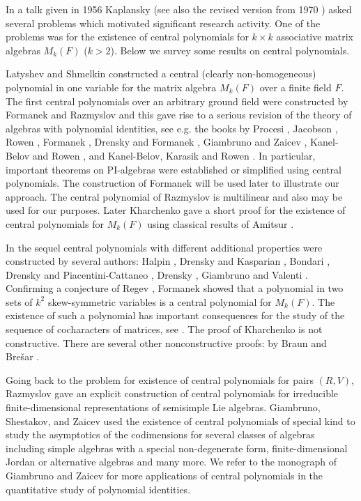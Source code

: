 \documentclass[10]{amsart}
\theoremstyle{definition}
\begin{document}
In a talk given in 1956 Kaplansky \cite{K1} (see also the revised version from 1970 \cite{K2}) asked several problems which
motivated significant research activity. One of the problems was for the existence of central polynomials for
$k\times k$ associative matrix algebras $M_k(F)$ ($k>2$). Below we survey some results on central polynomials.

Latyshev and Shmelkin \cite{LS} constructed a central (clearly non-homogeneous) polynomial in one variable
for the matrix algebra $M_k(F)$ over a finite field $F$.
The first central polynomials over an arbitrary ground field were constructed by Formanek \cite{F1} and Razmyslov \cite{R1}
and this gave rise to a serious revision of the theory of algebras with polynomial identities, see e.g. the books by
Procesi \cite{P}, Jacobson \cite{J2}, Rowen \cite{Ro}, Formanek \cite{F4}, Drensky and Formanek \cite{DF}, Giambruno and Zaicev \cite{GZ}, Kanel-Belov and Rowen \cite{K-BRo},
and Kanel-Belov, Karasik and Rowen \cite{K-BKRo}.
In particular, important theorems on PI-algebras were established or simplified using central polynomials.
The construction of Formanek \cite{F1} will be used later to illustrate our approach.
The central polynomial of Razmyslov \cite{R1} is multilinear and also may be used for our purposes.
Later Kharchenko \cite{Kh} gave a short proof for the existence of central polynomials for $M_k(F)$ using classical results of Amitsur \cite{A1, A2}.

In the sequel central polynomials with different additional properties were constructed by several authors:
Halpin \cite{H},  Drensky and Kasparian \cite{DK}, Bondari \cite{Bo},
Drensky and Piacentini-Cattaneo \cite{DPC}, Drensky \cite{D1}, Giambruno and Valenti \cite{GV}.
Confirming a conjecture of Regev \cite{Re}, Formanek \cite{F3} showed that a polynomial in two sets of $k^2$ skew-symmetric variables
is a central polynomial for $M_k(F)$. The existence of such a polynomial has important consequences for the study
of the sequence of cocharacters of matrices, see \cite{F2}.
The proof of Kharchenko \cite{Kh} is not constructive. There are several other nonconstructive proofs:
by Braun \cite{Bra} and Bre\v{s}ar \cite{Bre1, Bre2}.

Going back to the problem for existence of central polynomials for pairs $(R,V)$, Razmyslov \cite{R2} gave an explicit construction of central polynomials
for irreducible finite-dimensional representations of semisimple Lie algebras. Giambruno, Shestakov, and Zaicev \cite{GSZ}
used the existence of central polynomials of special kind to study the asymptotics of the codimensions
for several classes of algebras including simple algebras with a special non-degenerate form,
finite-dimensional Jordan or alternative algebras and many more. We refer to the monograph of Giambruno and Zaicev \cite{GZ} for more
applications of central polynomials in the quantitative study of polynomial identities.
\end{document}
